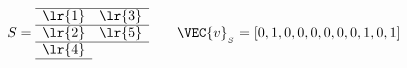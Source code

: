 \[
S = 
\begin{array}[c]{*{2}c}\cline{1-2}
\lr{1}&\lr{3}\\\cline{1-2}
\lr{2}&\lr{5}\\\cline{1-2}
\lr{4}\\\cline{1-1}
\end{array} \hspace{20pt}
\VEC{v}_{_{S}} = [0,1,0,0,0,0,0,0,1,0,1]
\]
